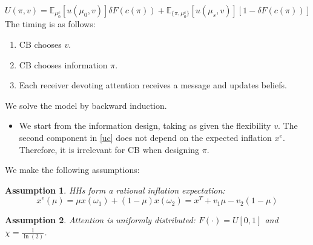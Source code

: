 \documentclass{beamer}
\newtheorem{assumption}{Assumption}
\begin{document}
\begin{frame}[allowframebreaks]
\begin{equation}
U(\pi,v)=\mathbb{E}_{\mu_0^c}[u(\mu_0,v)]\delta F(c(\pi)) + \mathbb{E}_{\{\pi,\mu_0^c\}}[u(\mu_s,v)][1-\delta F(c(\pi))]
\end{equation}
The timing is as follows:
\begin{enumerate}
    \item CB chooses $v$.
    \item CB chooses information $\pi$.
    \item Each receiver devoting attention receives a message and updates beliefs.
\end{enumerate}
\vskip5pt
\framebreak
We solve the model by backward induction.
\begin{itemize}
    \item We start from the information design, taking as given the flexibility $v$. The second component in \eqref{uc} does not depend on the expected inflation $x^e$. Therefore, it is irrelevant for CB when designing $\pi$.
\end{itemize}
\vskip5pt
We make the following assumptions:
\begin{assumption}
    \label{Ass1}
    HHs form a rational inflation expectation:
    \begin{equation}
    \label{expectedinflation}
    x^e(\mu)=\mu x(\omega_1)+(1-\mu)x(\omega_2)=x^T+v_1\mu-v_2(1-\mu)
    \end{equation}
\end{assumption}
\begin{assumption}
\label{Ass2}
    Attention is uniformly distributed: $F(\cdot)=U[0,1]$ and $\chi=\frac{1}{\ln(2)}$.
\end{assumption}
\end{frame}
\end{document}
